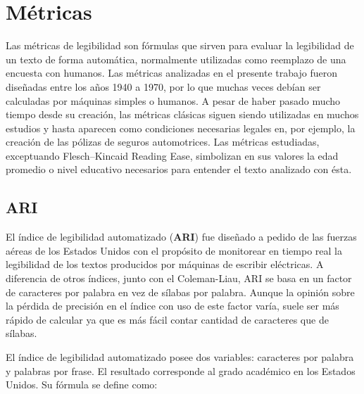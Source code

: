 \documentclass[12pt,journal,compsoc]{IEEEtran}
\begin{document}

\section{Métricas}

Las métricas de legibilidad son fórmulas que sirven para evaluar la legibilidad de un texto de forma automática, normalmente utilizadas como reemplazo de una encuesta con humanos. Las métricas analizadas en el presente trabajo fueron diseñadas entre los años 1940 a 1970, por lo que muchas veces debían ser calculadas por máquinas simples o humanos. A pesar de haber pasado mucho tiempo desde su creación, las métricas clásicas siguen siendo utilizadas en muchos estudios y hasta aparecen como condiciones necesarias legales en, por ejemplo, la creación de las pólizas de seguros automotrices. Las métricas estudiadas, exceptuando Flesch–Kincaid Reading Ease, simbolizan en sus valores la edad promedio o nivel educativo necesarios para entender el texto analizado con ésta. %

\subsection{ARI}

El índice de legibilidad automatizado (\textbf{ARI})\cite{ari-flesch} fue diseñado a pedido de las fuerzas aéreas de los Estados Unidos con el propósito de monitorear en tiempo real la legibilidad de los textos producidos por máquinas de escribir eléctricas. A diferencia de otros índices, junto con el Coleman-Liau, ARI se basa en un factor de caracteres por palabra en vez de sílabas por palabra. Aunque la opinión sobre la pérdida de precisión en el índice con uso de este factor varía, suele ser más rápido de calcular ya que es más fácil contar cantidad de caracteres que de sílabas\cite{liang}.

El índice de legibilidad automatizado posee dos variables: caracteres por palabra y palabras por frase. El resultado corresponde al grado académico en los Estados Unidos. Su fórmula se define como:
\end{document}
